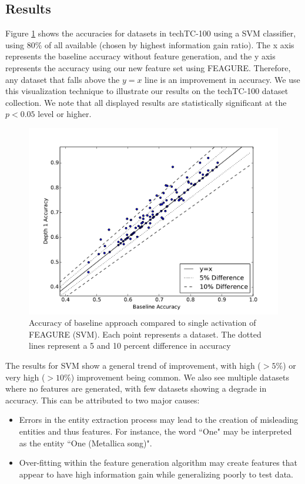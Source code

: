 \documentclass[twoside,11pt]{article}
\theoremstyle{definition}
\begin{document}
\subsection{Results}

Figure \ref{fig:svm_base_lvl1} shows the accuracies for datasets in techTC-100 using a SVM classifier, using $80\%$ of all available (chosen by highest information gain ratio). The x axis represents the baseline accuracy without feature generation, and the y axis represents the accuracy using our new feature set using FEAGURE. Therefore, any dataset that falls above the $y=x$ line is an improvement in accuracy. We use this visualization technique to illustrate our results on the techTC-100 dataset collection. We note that all displayed results are statistically significant at the $p<0.05$ level or higher.

\begin{figure}
	\centering
	\includegraphics[width=0.8\linewidth]{svm_08_base_vs_lvl1}
	\caption{Accuracy of
		baseline approach compared to single activation of FEAGURE (SVM). Each point represents a dataset. The dotted lines represent a 5 and 10 percent difference in accuracy}
	\label{fig:svm_base_lvl1}
\end{figure}

The results for SVM show a general trend of improvement, with high ($> 5\%$) or very high ($>10\%$) improvement being common. We also see multiple datasets where no features are generated, with few datasets showing a degrade in accuracy.
This can be attributed to two major causes:
\begin{itemize}
	\item Errors in the entity extraction process may lead to the creation of misleading entities and thus features. For instance, the word ``One" may be interpreted as the entity ``One (Metallica song)". 
	\item Over-fitting within the feature generation algorithm may create features that appear to have high information gain while generalizing poorly to test data.
\end{itemize}
\end{document}
